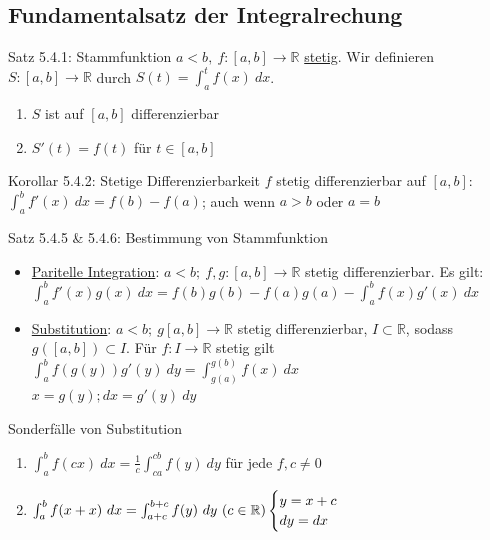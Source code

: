 \documentclass[a4paper,10pt]{article}
\def\R{\mathbb{R}}
\begin{document}
\subsection{Fundamentalsatz der Integralrechung}
\begin{tbox}
    {Satz 5.4.1: Stammfunktion}
    $a<b,\ f:[a,b]\longrightarrow \mathbb R$ \underline{stetig}. Wir definieren 
    \\$S:[a,b]\longrightarrow\mathbb R$ durch $S(t)= \int_a^t f(x)\ dx$.
    \begin{enumerate}
        \item $S$ ist auf $[a,b]$ differenzierbar
        \item $S'(t)=f(t)$ für $t\in[a,b]$
    \end{enumerate}
\end{tbox}
\begin{tbox}
    {Korollar 5.4.2: Stetige Differenzierbarkeit}
    $f$ stetig differenzierbar auf $[a,b]$: $\int_a^bf'(x)\ dx = f(b)-f(a)$; auch wenn $a>b$ oder $a=b$
\end{tbox}
\begin{tbox}
    {Satz 5.4.5 \& 5.4.6: Bestimmung von Stammfunktion}
    \begin{itemize}
        \item \underline{Paritelle Integration}: $a<b;\ f,g:[a,b]\longrightarrow \mathbb R$ stetig differenzierbar. Es gilt: $\int_a^b f'(x)g(x)\ dx= f(b)g(b)-f(a)g(a)-\int_a^b f(x)g'(x)\ dx$
        \item \underline{Substitution}: $a<b;\ g[a,b]\longrightarrow \mathbb R$ stetig differenzierbar, $I\subset\mathbb R$, sodass $g([a,b])\subset I$. Für $f:I\longrightarrow \mathbb R$ stetig gilt $\int_a^b f(g(y))g'(y)\ dy = \int_{g(a)}^{g(b)} f(x)\ dx$
        \\ $x=g(y); dx=g'(y)\ dy$
    \end{itemize}
\end{tbox}
\begin{tipbox}
    {Sonderfälle von Substitution}
    \begin{enumerate}
        \item $\int_a^b f(cx)\ dx=\frac 1 c\int_{ca}^{cb}f(y)\ dy$ für jede $f,c\neq 0$
        \item $\int^b_a f(x+x)\ dx
        \\=\int_{a+c}^{b+c}f(y)\ dy \ (c\in \R)
            \begin{cases}
            y=x+c\\
            dy=dx\end{cases}$
    \end{enumerate}
\end{tipbox}
\end{document}
